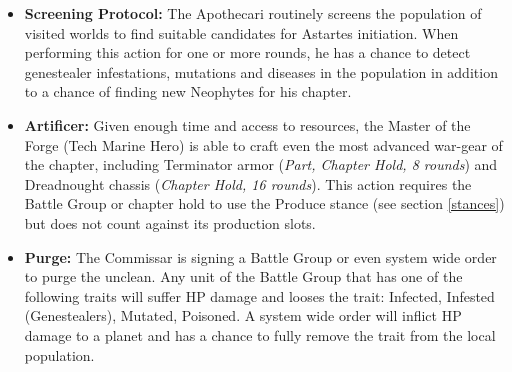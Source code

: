 \begin{itemize}
\begin{itemize}
		\item \textbf{Screening Protocol:} The Apothecari routinely screens the population of visited worlds to find suitable candidates for Astartes initiation. When performing this action for one or more rounds, he has a chance to detect genestealer infestations, mutations and diseases in the population in addition to a chance of finding new Neophytes for his chapter.
		\item \textbf{Artificer:} Given enough time and access to resources, the Master of the Forge (Tech Marine Hero) is able to craft even the most advanced war-gear of the chapter, including Terminator armor (\textit{Part, Chapter Hold, 8 rounds}) and Dreadnought chassis (\textit{Chapter Hold, 16 rounds}). This action requires the Battle Group or chapter hold to use the Produce stance (see section \ref{stances}) but does not count against its production slots.
		\item \textbf{Purge:} The Commissar is signing a Battle Group or even system wide order to purge the unclean. Any unit of the Battle Group that has one of the following traits will suffer HP damage and looses the trait: Infected, Infested (Genestealers), Mutated, Poisoned. A system wide order will inflict HP damage to a planet and has a chance to fully remove the trait from the local population.
	\end{itemize}
\end{itemize}

